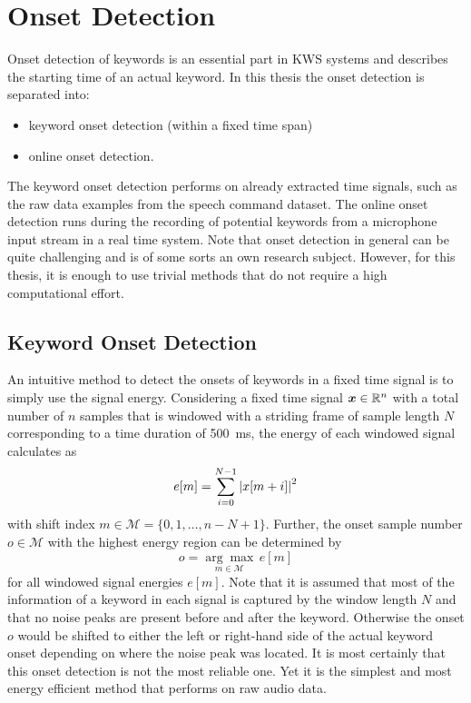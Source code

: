
\section{Onset Detection}\label{sec:signal_onset}
Onset detection of keywords is an essential part in KWS systems and describes the starting time of an actual keyword.
In this thesis the onset detection is separated into:
\begin{itemize}
  \item keyword onset detection (within a fixed time span)
  \item online onset detection.
\end{itemize}
The keyword onset detection performs on already extracted time signals, such as the raw data examples from the speech command dataset.
The online onset detection runs during the recording of potential keywords from a microphone input stream in a real time system.
Note that onset detection in general can be quite challenging and is of some sorts an own research subject.
However, for this thesis, it is enough to use trivial methods that do not require a high computational effort.



\subsection{Keyword Onset Detection}\label{sec:signal_onset_kw}
An intuitive method to detect the onsets of keywords in a fixed time signal is to simply use the signal energy.
Considering a fixed time signal $\bm{x} \in \mathbb{R}^n$ with a total number of $n$ samples that is windowed with a striding frame of sample length $N$ corresponding to a time duration of \SI{500}{\milli\second}, the energy of each windowed signal calculates as
\begin{equation}\label{eq:e_win}
  e[m] = \sum_{i=0}^{N-1} \abs{x[m + i]}^2
\end{equation}
with shift index $m \in \mathcal{M} = \{0, 1, \dots, n - N + 1\}$.
Further, the onset sample number $o \in \mathcal{M}$ with the highest energy region can be determined by
\begin{equation}\label{eq:onset}
  o = \underset{m \in \mathcal{M}}{\arg \max} \, e[m]
\end{equation}
for all windowed signal energies $e[m]$.
Note that it is assumed that most of the information of a keyword in each signal is captured by the window length $N$ and that no noise peaks are present before and after the keyword. 
Otherwise the onset $o$ would be shifted to either the left or right-hand side of the actual keyword onset depending on where the noise peak was located.
It is most certainly that this onset detection is not the most reliable one. 
Yet it is the simplest and most energy efficient method that performs on raw audio data.


